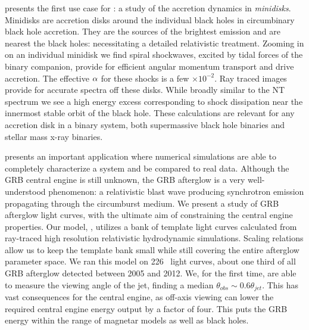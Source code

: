  presents the first use case for \grdisco: a study of the accretion dynamics in \emph{minidisks}.  Minidisks are accretion disks around the individual black holes in circumbinary black hole accretion.  They are the sources of the brightest emission and are nearest the black holes: necessitating a detailed relativistic treatment.  Zooming in on an individual minidisk we find spiral shockwaves, excited by tidal forces of the binary companion, provide for efficient angular momentum transport and drive accretion.  The effective $\alpha$ for these shocks is a few $\times 10^{-2}$.  Ray traced images provide for accurate spectra off these disks.  While broadly similar to the NT spectrum we see a high energy excess corresponding to shock dissipation near the innermost stable orbit of the black hole.  These calculations are relevant for any accretion disk in a binary system, both supermassive black hole binaries and stellar mass x-ray binaries.  

 presents an important application where numerical simulations are able to completely characterize a system and be compared to real data.  Although the GRB central engine is still unknown, the GRB afterglow is a very well-understood phenomenon: a relativistic blast wave producing synchrotron emission propagating through the circumburst medium.  We present a study of GRB afterglow light curves, with the ultimate aim of constraining the central engine properties.  Our model, \scalefit, utilizes a bank of template light curves calculated from ray-traced high resolution relativistic hydrodynamic simulations.  Scaling relations allow us to keep the template bank small while still covering the entire afterglow parameter space.  We ran this model on 226 \swiftXRT\ light curves, about one third of all GRB afterglow detected between 2005 and 2012.  We, for the first time, are able to measure the viewing angle of the jet, finding a median $\theta_{obs} \sim 0.6 \theta_{jet}$.  This has vast consequences for the central engine, as off-axis viewing can lower the required central engine energy output by a factor of four.  This puts the GRB energy within the range of magnetar models as well as black holes.

